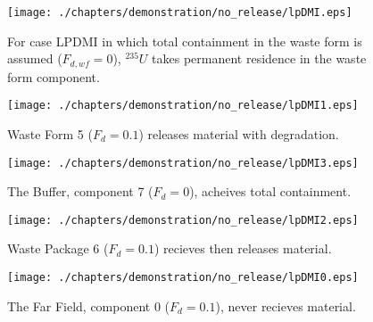 

\begin{figure}[ht]
\centering
\texttt{[image: ./chapters/demonstration/no\_release/lpDMI.eps]}
\caption[$^{235}U$ residence. Lumped Parameter  DM Waste Form No Release.]{
For case LPDMI  in which total containment in the waste form is assumed 
($F_{d,wf}=0$), $^{235}U$ 
takes permanent residence in the waste form  component.
}
\label{fig:lpDMIall}
\begin{minipage}[b]{0.45\linewidth}

  \texttt{[image: ./chapters/demonstration/no\_release/lpDMI1.eps]}
  \caption[LPDMI Waste Form Contaminants.]{
    Waste Form 5 ($F_d = 0.1$) releases material with degradation. 
    }
  \label{fig:lpDMIwf5}
  
  \texttt{[image: ./chapters/demonstration/no\_release/lpDMI3.eps]}
  \caption[Case LPDMI Buffer Contaminants]{
    The Buffer, component 7 ($F_d=0$), acheives total containment.
    }
  \label{fig:lpDMIbuff}

\end{minipage}
\hspace{0.05\linewidth}
\begin{minipage}[b]{0.45\linewidth}
  \texttt{[image: ./chapters/demonstration/no\_release/lpDMI2.eps]}
  \caption[Case LPDMI Waste Package Contaminants.]{ 
    Waste Package 6 ($F_d = 0.1$) recieves then releases material. 
    }
  \label{fig:lpDMIwp6}

  \texttt{[image: ./chapters/demonstration/no\_release/lpDMI0.eps]}
  \caption[Case LPDMI Waste Package Contaminants.]{ 
    The Far Field, component 0 ($F_d = 0.1$), never recieves material.
    }
  \label{fig:lpDMIff0}


  \end{minipage}
\end{figure}
